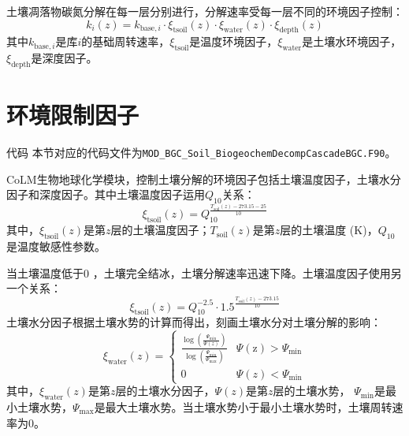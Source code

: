 土壤凋落物碳氮分解在每一层分别进行，分解速率受每一层不同的环境因子控制：
\begin{equation}
  k_{i}(z)=k_{\mathrm{base},i} \cdot \xi_{\mathrm{tsoil}}(z) \cdot \xi_{\mathrm{water}}(z) \cdot \xi_{\mathrm{depth}}(z)
\end{equation}
其中$k_{\mathrm{base},i}$是库$i$的基础周转速率，$\xi_{\mathrm{tsoil}}$是温度环境因子，$\xi_{\mathrm{water}}$是土壤水环境因子，$\xi_{\mathrm{depth}}$是深度因子。


\section{环境限制因子}\label{环境限制因子}

\begin{mymdframed}{代码}
  本节对应的代码文件为\texttt{MOD\_BGC\_Soil\_BiogeochemDecompCascadeBGC.F90}。
\end{mymdframed}

CoLM生物地球化学模块，控制土壤分解的环境因子包括土壤温度因子，土壤水分因子和深度因子。其中土壤温度因子运用$Q_{10}$关系：
\begin{equation}
  \xi_{\mathrm{t s o i l}}(z)=Q_{10}^{\frac{T_{\mathrm{{soil }}}(z)-273.15-25}{10}}
\end{equation}
其中，$\xi_{\mathrm{tsoil}}\left(z\right)$是第$z$层的土壤温度因子；$T_{\mathrm{soil}}\left(z\right)$是第$z$层的土壤温度 (K)，$Q_{10}$是温度敏感性参数。


当土壤温度低于0 \textcelsius，土壤完全结冰，土壤分解速率迅速下降。土壤温度因子使用另一个关系：
\begin{equation}
  \xi_{\mathrm{t s o i l}}(z)=Q_{10}^{-2.5} \cdot 1.5^{\frac{T_{\mathrm{{soil }}}(z)-273.15}{10}}
\end{equation}
土壤水分因子根据土壤水势的计算而得出，刻画土壤水分对土壤分解的影响：
\begin{equation}
  \xi_{\mathrm{w a t e r}}(z)=\begin{cases}
    \frac{\log \left(\frac{\Psi_{\min }}{\Psi(z)}\right)}{\log \left(\frac{\Psi_{\min }}{\Psi_{\max }}\right)}
    & \Psi(\mathrm{z})>\Psi_{\min } \\
    0  & \Psi(z)<\Psi_{\min }
  \end{cases}
\end{equation}
其中，$\xi_{\mathrm{water}}\left(z\right)$是第$z$层的土壤水分因子，$\Psi\left(z\right)$是第$z$层的土壤水势，
$\Psi_{\mathrm{min}}$是最小土壤水势，$\Psi_{\mathrm{max}}$是最大土壤水势。当土壤水势小于最小土壤水势时，土壤周转速率为0。



